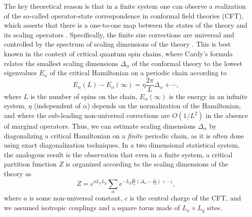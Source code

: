 \documentclass[aps,prl,twocolumn,showpacs,superscriptaddress,floatfix,10pt]{revtex4-1}
\begin{document}
The key theoretical reason is that in a finite system one can observe a realization of the so-called operator-state correspondence in conformal field theories (CFT), which asserts that there is a one-to-one map between the states of the theory and its scaling operators \cite{CFTbook}. Specifically, the finite size corrections are universal and controlled by the spectrum of scaling dimensions of the theory \cite{Cardy}. This is best known in the context of critical quantum spin chains, where Cardy's formula relates the smallest scaling dimensions $\Delta_{\alpha}$ of the conformal theory to the lowest eigenvalues $E_{\alpha}$ of the critical Hamiltonian on a periodic chain according to
\begin{equation} \label{eq:Cardy}
E_{\alpha}(L) - E_{\alpha}(\infty) = \eta \frac{2\pi}{L} \Delta_{\alpha} + \cdots,
\end{equation}
where $L$ is the number of spins on the chain, $E_{\alpha}(\infty)$ is the energy in an infinite system, $\eta$ (independent of $\alpha$) depends on the normalization of the Hamiltonian, and where the sub-leading non-universal corrections are $O(1/L^2)$ in the absence of marginal operators. Thus, we can estimate scaling dimensions $\Delta_{\alpha}$ by diagonalizing a critical Hamiltonian on a \textit{finite} periodic chain, as it is often done using exact diagonalization techniques. In a two dimensional statistical system, the analogous result is the observation that even in a finite system, a critical partition function $Z$ is organized according to the scaling dimensions of the theory as
\begin{equation} \label{eq:Z1}
Z = e^{a L_xL_y} \sum_{\alpha} e^{-L_y\frac{2\pi}{L_x}(\Delta_{\alpha} - \frac{c}{12}) + \cdots)},
\end{equation}
where $a$ is some non-universal constant, $c$ is the central charge of the CFT, and we assumed isotropic couplings and a square torus made of $L_x \times L_y$ sites. 
\end{document}
